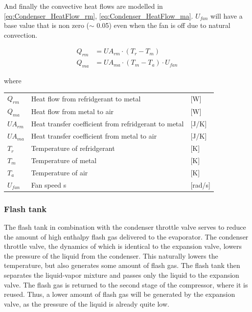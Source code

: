 And finally the convective heat flows are modelled in \cref{eq:Condenser_HeatFlow_rm}, \cref{eq:Condenser_HeatFlow_ma}. $ U_{fan}	 $ will have a base value that is non zero ($ \sim $ 0.05) even when the fan is off due to natural convection. 

\begin{align}
	Q_{rm}	 			& = U A_{rm} \cdot (T_r - T_m)							\label{eq:Condenser_HeatFlow_rm}\\
	Q_{ma}	 			& = U A_{ma} \cdot (T_m - T_a)\cdot U_{fan}				\label{eq:Condenser_HeatFlow_ma}
\end{align}	

where 

\begin{center}
	\begin{tabular}{l p{8cm} l}
		$Q_{rm}$				&	Heat flow from refridgerant to metal					& [\si{W}] \\
		$Q_{ma}$				&	Heat flow from metal to air								& [\si{W}] \\
		$U A_{rm}$				& 	Heat transfer coefficient from refridgerant to metal 	& [\si{J}/\si{K}] \\
		$U A_{ma}$				& 	Heat transfer coefficient from metal to air				& [\si{J}/\si{K}] \\
		$T_r$					& 	Temperature of refridgerant 							& [\si{K}] \\	
		$T_m$					&	Temperature of metal 									& [\si{K}] \\
		$T_a$					&	Temperature of air 										& [\si{K}] \\
		$U_{fan}$				&	Fan speed											s	& [\si{rad}/\si{s}] \\
	\end{tabular}
\end{center}



\subsubsection{Flash tank}
The flash tank in combination with the condenser throttle valve serves to reduce the amount of high enthalpy flash gas delivered to the evaporator. The condenser throttle valve, the dynamics of which is identical to the expansion valve, lowers the pressure of the liquid from the condenser. This naturally lowers the temperature, but also generates some amount of flash gas. The flash tank then separates the liquid-vapor mixture and passes only the liquid to the expansion valve. The flash gas is returned to the second stage of the compressor, where it is reused. Thus, a lower amount of flash gas will be generated by the expansion valve, as the pressure of the liquid is already quite low.

